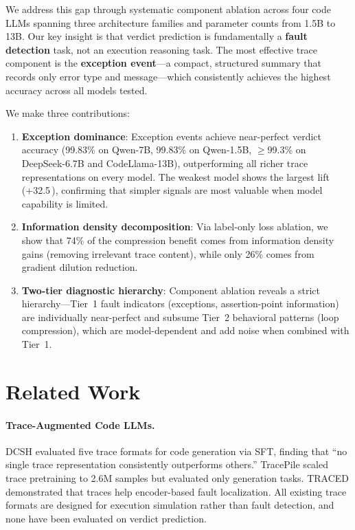\documentclass[11pt]{article}
\newcommand{\pp}{\,\text{pp}}
\begin{document}
We address this gap through systematic component ablation across four code LLMs spanning three architecture families and parameter counts from 1.5B to 13B.
Our key insight is that verdict prediction is fundamentally a \textbf{fault detection} task, not an execution reasoning task.
The most effective trace component is the \textbf{exception event}---a compact, structured summary that records only error type and message---which consistently achieves the highest accuracy across all models tested.

We make three contributions:
\begin{enumerate}[nosep,leftmargin=*]
\item \textbf{Exception dominance}: Exception events achieve near-perfect verdict accuracy (99.83\% on Qwen-7B, 99.83\% on Qwen-1.5B, $\geq$99.3\% on DeepSeek-6.7B and CodeLlama-13B), outperforming all richer trace representations on every model. The weakest model shows the largest lift (+32.5\pp), confirming that simpler signals are most valuable when model capability is limited.

\item \textbf{Information density decomposition}: Via label-only loss ablation, we show that 74\% of the compression benefit comes from information density gains (removing irrelevant trace content), while only 26\% comes from gradient dilution reduction.

\item \textbf{Two-tier diagnostic hierarchy}: Component ablation reveals a strict hierarchy---Tier~1 fault indicators (exceptions, assertion-point information) are individually near-perfect and subsume Tier~2 behavioral patterns (loop compression), which are model-dependent and add noise when combined with Tier~1.
\end{enumerate}

\section{Related Work}
\label{sec:related}

\paragraph{Trace-Augmented Code LLMs.}
DCSH \cite{ni2024dcsh} evaluated five trace formats for code generation via SFT, finding that ``no single trace representation consistently outperforms others.''
TracePile \cite{jain2025tracepile} scaled trace pretraining to 2.6M samples but evaluated only generation tasks.
TRACED \cite{traced2024} demonstrated that traces help encoder-based fault localization.
All existing trace formats are designed for execution simulation rather than fault detection, and none have been evaluated on verdict prediction.
\end{document}
